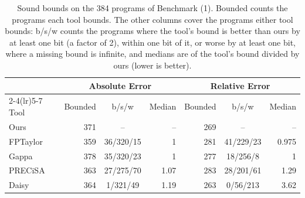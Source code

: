 \begin{table}[H] \centering \small
\caption{Sound bounds on the 384 programs of Benchmark (1). Bounded counts the programs each tool bounds. The other columns cover the programs either tool bounds: b/s/w counts the programs where the tool's bound is better than ours by at least one bit (a factor of 2), within one bit of it, or worse by at least one bit, where a missing bound is infinite, and medians are of the tool's bound divided by ours (lower is better).}\label{tab:tightness}
\begin{tabular}{lrcrrcr}
\toprule
& \multicolumn{3}{c}{Absolute Error} & \multicolumn{3}{c}{Relative Error} \\
\cmidrule(lr){2-4}\cmidrule(lr){5-7}
Tool & Bounded & b/s/w & Median & Bounded & b/s/w & Median \\
\midrule
Ours & 371 & -- & -- & 269 & -- & -- \\
FPTaylor & 359 & 36/320/15 & 1 & 281 & 41/229/23 & 0.975 \\
Gappa & 378 & 35/320/23 & 1 & 277 & 18/256/8 & 1 \\
PRECiSA & 363 & 27/275/70 & 1.07 & 283 & 28/201/61 & 1.29 \\
Daisy & 364 & 1/321/49 & 1.19 & 263 & 0/56/213 & 3.62 \\
\bottomrule
\end{tabular}
\end{table}
